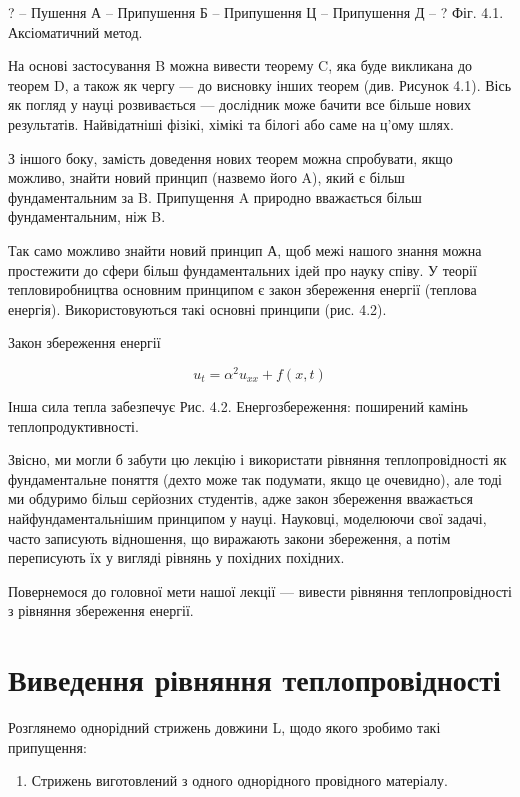 \documentclass[
  ukrainian,
]{article}
\providecommand{\tightlist}{%
  \setlength{\itemsep}{0pt}\setlength{\parskip}{0pt}}
\begin{document}
? -- Пушення А -- Припушення Б -- Припушення Ц -- Припушення Д -- ? Фіг.
4.1. Аксіоматичний метод.

На основі застосування B можна вивести теорему C, яка буде викликана до
теорем D, а також як чергу --- до висновку інших теорем (див. Рисунок
4.1). Вісь як погляд у науці розвивається --- дослідник може бачити все
більше нових результатів. Найвідатніші фізікі, хімікі та білогі або саме
на ц'ому шлях.

З іншого боку, замість доведення нових теорем можна спробувати, якщо
можливо, знайти новий принцип (назвемо його A), який є більш
фундаментальним за B. Припущення A природно вважається більш
фундаментальним, ніж B.

Так само можливо знайти новий принцип А, щоб межі нашого знання можна
простежити до сфери більш фундаментальних ідей про науку співу. У теорії
тепловиробництва основним принципом є закон збереження енергії (теплова
енергія). Використовуються такі основні принципи (рис. 4.2).

Закон збереження енергії

\[
u_t = \alpha^2 u_{xx} + f(x,t)
\]

Інша сила тепла забезпечує Рис. 4.2. Енергозбереження: поширений камінь
теплопродуктивності.

Звісно, ми могли б забути цю лекцію і використати рівняння
теплопровідності як фундаментальне поняття (дехто може так подумати,
якщо це очевидно), але тоді ми обдуримо більш серйозних студентів, адже
закон збереження вважається найфундаментальнішим принципом у науці.
Науковці, моделюючи свої задачі, часто записують відношення, що
виражають закони збереження, а потім переписують їх у вигляді рівнянь у
похідних похідних.

Повернемося до головної мети нашої лекції --- вивести рівняння
теплопровідності з рівняння збереження енергії.

\section{Виведення рівняння
теплопровідності}\label{ux432ux438ux432ux435ux434ux435ux43dux43dux44f-ux440ux456ux432ux43dux44fux43dux43dux44f-ux442ux435ux43fux43bux43eux43fux440ux43eux432ux456ux434ux43dux43eux441ux442ux456}

Розглянемо однорідний стрижень довжини L, щодо якого зробимо такі
припущення:

\begin{enumerate}
\def\labelenumi{\arabic{enumi}.}
\tightlist
\item
  Стрижень виготовлений з одного однорідного провідного матеріалу.
\end{enumerate}
\end{document}
